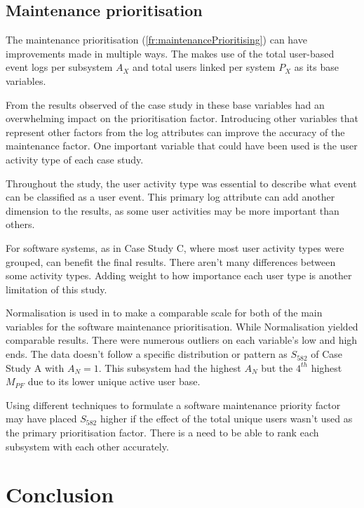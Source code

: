 \subsection{Maintenance prioritisation}
The maintenance prioritisation (\ref{fr:maintenancePrioritising}) can have improvements made in multiple ways. The  makes use of the total user-based event logs per subsystem $A_X$ and total users linked per system $P_X$ as its base variables.\par From the results observed of the case study in  these base variables had an overwhelming impact on the prioritisation factor. Introducing other variables that represent other factors from the log attributes can improve the accuracy of the maintenance factor. One important variable that could have been used is the user activity type of each case study.\par Throughout the study, the user activity type was essential to describe what event can be classified as a user event. This primary log attribute can add another dimension to the results, as some user activities may be more important than others. \par For software systems, as in Case Study C, where most user activity types were grouped, can benefit the final results. There aren't many differences between some activity types. Adding weight to how importance each user type is another limitation of this study.\par Normalisation is used in  to make a comparable scale for both of the main variables for the software maintenance prioritisation. While Normalisation yielded comparable results. There were numerous outliers on each variable's low and high ends. The data doesn't follow a specific distribution or pattern as $S_{582}$ of Case Study A with $A_N=1$. This subsystem had the highest $A_N$ but the $4^{th}$ highest $M_{PF}$ due to its lower unique active user base.\par Using different techniques to formulate a software maintenance priority factor may have placed $S_{582}$ higher if the effect of the total unique users wasn't used as the primary prioritisation factor. There is a need to be able to rank each subsystem with each other accurately.

\section{Conclusion}

